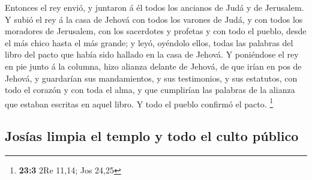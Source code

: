  Entonces el rey envió, y juntaron á él todos los ancianos
de Judá y de Jerusalem.  Y subió el rey á la casa de Jehová
con todos los varones de Judá, y con todos los moradores de Jerusalem,
con los sacerdotes y profetas y con todo el pueblo, desde el más chico
hasta el más grande; y leyó, oyéndolo ellos, todas las palabras del
libro del pacto que había sido hallado en la casa de Jehová.
 Y poniéndose el rey en pie junto á la columna, hizo alianza
delante de Jehová, de que irían en pos de Jehová, y guardarían sus
mandamientos, y sus testimonios, y sus estatutos, con todo el corazón y
con toda el alma, y que cumplirían las palabras de la alianza que
estaban escritas en aquel libro. Y todo el pueblo confirmó el pacto.
\footnote{\textbf{23:3} 2Re 11,14; Jos 24,25}

\hypertarget{josuxedas-limpia-el-templo-y-todo-el-culto-puxfablico}{%
\subsection{Josías limpia el templo y todo el culto
público}\label{josuxedas-limpia-el-templo-y-todo-el-culto-puxfablico}}

